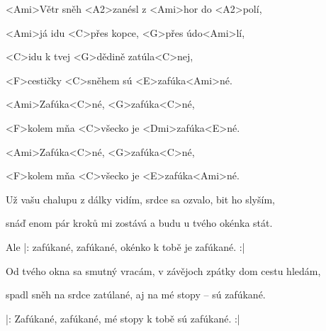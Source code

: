 





\zs
<Ami>Větr sněh <A2>zanésl z <Ami>hor do <A2>polí,

<Ami>já idu <C>přes kopce, <G>přes údo<Ami>lí, 

<C>idu k tvej <G>dědině zatúla<C>nej,

<F>cestičky <C>sněhem sú <E>zafúka<Ami>né.
\ks

\zr
<Ami>Zafúka<C>né, <G>zafúka<C>né,

<F>kolem mňa <C>všecko je <Dmi>zafúka<E>né. 

<Ami>Zafúka<C>né, <G>zafúka<C>né,

<F>kolem mňa <C>všecko je <E>zafúka<Ami>né.
\kr

\zs
Už vašu chalupu z dálky vidím, srdce sa ozvalo, bit ho slyším,

snáď enom pár kroků mi zostává a budu u tvého okénka stát.
\ks

\zr
Ale |: zafúkané, zafúkané, okénko k tobě je zafúkané. :|
\kr

\zs
Od tvého okna sa smutný vracám, v závějoch zpátky dom cestu hledám,

spadl sněh na srdce zatúlané, aj na mé stopy – sú zafúkané.
\ks

\zr
|: Zafúkané, zafúkané, mé stopy k tobě sú zafúkané. :|
\kr







\kp
